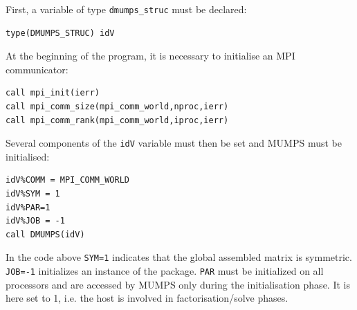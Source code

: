 First, a variable of type {\tt dmumps\_struc} must be declared:
\begin{verbatim}
type(DMUMPS_STRUC) idV 
\end{verbatim}

At the beginning of the program, it is necessary to 
initialise an MPI communicator:

\begin{verbatim}
call mpi_init(ierr)                            
call mpi_comm_size(mpi_comm_world,nproc,ierr) 
call mpi_comm_rank(mpi_comm_world,iproc,ierr) 
\end{verbatim}

Several components of the {\tt idV} variable must then be set and MUMPS 
must be initialised: 
\begin{verbatim}
idV%COMM = MPI_COMM_WORLD 
idV%SYM = 1              
idV%PAR=1                
idV%JOB = -1             
call DMUMPS(idV)        
\end{verbatim}

In the code above
{\tt SYM=1} indicates that the global assembled matrix is symmetric.
{\tt JOB=-1} initializes an instance of the package. 
{\tt PAR} must be initialized on all processors and are accessed by MUMPS only during the initialisation phase.
It is here set to 1, i.e. the host is involved in factorisation/solve phases.

